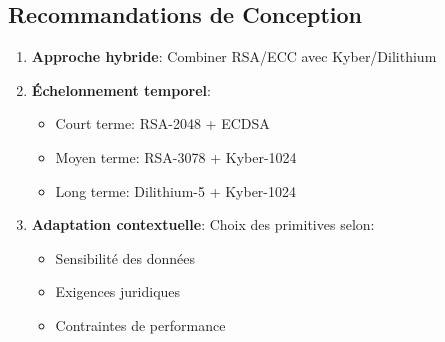 \subsection{Recommandations de Conception}
\begin{enumerate}
\item \textbf{Approche hybride}: Combiner RSA/ECC avec Kyber/Dilithium
\item \textbf{Échelonnement temporel}: 
\begin{itemize}
\item Court terme: RSA-2048 + ECDSA
\item Moyen terme: RSA-3078 + Kyber-1024
\item Long terme: Dilithium-5 + Kyber-1024
\end{itemize}
\item \textbf{Adaptation contextuelle}: Choix des primitives selon:
\begin{itemize}
\item Sensibilité des données
\item Exigences juridiques
\item Contraintes de performance
\end{itemize}
\end{enumerate}

